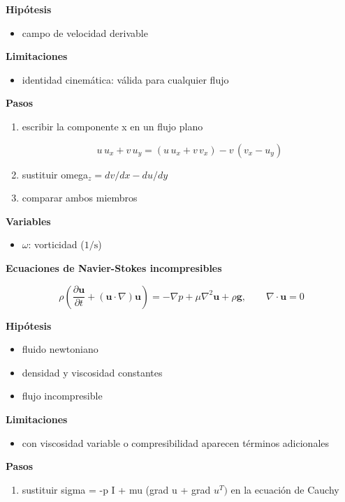 \documentclass[10pt,openany]{book}
\begin{document}
\begin{tcolorbox}[title={Desarrollos del modelo}, studiumdef, breakable]
\noindent\textbf{Hipótesis}
\begin{itemize}
\item campo de velocidad derivable
\end{itemize}

\noindent\textbf{Limitaciones}
\begin{itemize}
\item identidad cinemática: válida para cualquier flujo
\end{itemize}

\noindent\textbf{Pasos}
\begin{enumerate}
\item
escribir la componente x en un flujo plano

\[
u\,u_x + v\,u_y = \left(u\,u_x + v\,v_x\right) - v\,(v_x - u_y)
\]
\item
sustituir omega\(_z = dv/dx - du/dy\)
\item
comparar ambos miembros
\end{enumerate}

\noindent\textbf{Variables}
\begin{itemize}
\item $\omega$: vorticidad ($\mathrm{1/s}$)
\end{itemize}



\noindent\textbf{Ecuaciones de Navier-Stokes incompresibles}

\[
\rho\left(\frac{\partial\mathbf{u}}{\partial t} + (\mathbf{u}\cdot\nabla)\mathbf{u}\right) = -\nabla p + \mu\nabla^{2}\mathbf{u} + \rho\mathbf{g},\qquad \nabla\cdot\mathbf{u} = 0
\]

\noindent\textbf{Hipótesis}
\begin{itemize}
\item fluido newtoniano
\item densidad y viscosidad constantes
\item flujo incompresible
\end{itemize}

\noindent\textbf{Limitaciones}
\begin{itemize}
\item con viscosidad variable o compresibilidad aparecen términos adicionales
\end{itemize}

\noindent\textbf{Pasos}
\begin{enumerate}
\item
sustituir sigma = -p I + mu (grad u + grad \(u^T)\) en la ecuación de Cauchy


\end{enumerate}
\end{tcolorbox}
\end{document}
